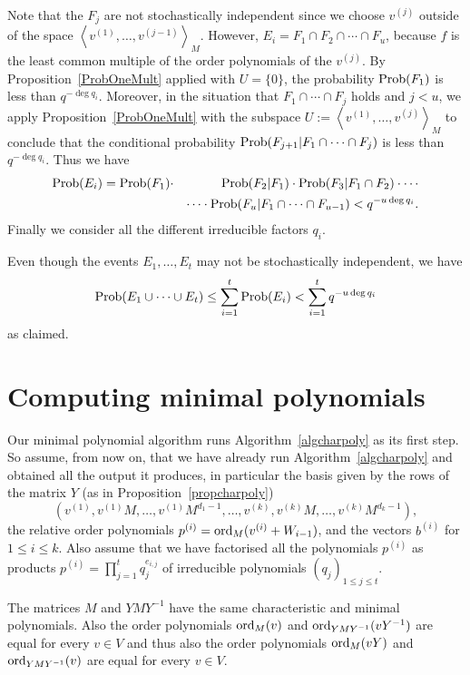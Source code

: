 Note that
the $F_j$ are not stochastically independent since we choose
$v^{(j)}$ outside of the space $\left< v^{(1)}, \ldots, v^{(j-1)}\right>_M$.
However, $E_i = F_1 \cap F_2 \cap \cdots \cap F_u$, because $f$ is the
least common multiple of the order polynomials of the $v^{(j)}$.
By Proposition~\ref{ProbOneMult} applied with $U=\{0\}$, 
the probability $\mathrm{Prob}(F_1)$
is less than $q^{-\deg q_i}$. Moreover, in the situation that 
$F_1 \cap \cdots \cap F_j$ holds and $j<u$,
we apply Proposition~\ref{ProbOneMult} with the
subspace $U := \left< v^{(1)}, \ldots, v^{(j)} \right>_M$ to conclude
that the conditional probability $\mathrm{Prob}(F_{j+1} | F_1 \cap \cdots \cap F_j)$
is less than $q^{-\deg q_i}$.
Thus we have
\begin{eqnarray*}
\mathrm{Prob}(E_i) = \mathrm{Prob}(F_1)&\cdot& \mathrm{Prob}(F_2 | F_1) \cdot \mathrm{Prob}(F_3 | F_1 \cap F_2)
   \cdot \cdots \\
    && \cdots \cdot \mathrm{Prob}(F_u | F_1 \cap \cdots \cap F_{u-1}) 
   < q^{-u\deg q_i}.
\end{eqnarray*}
Finally we consider all the different irreducible factors $q_i$. 

Even though
the events $E_1,\ldots,E_t$ may not be stochastically independent, we have
\[ \mathrm{Prob}( E_1 \cup \cdots \cup E_t ) \le \sum_{i=1}^t \mathrm{Prob}(E_i)
   < \sum_{i=1}^t q^{-u\deg q_i} \]
as claimed.
\proofend

\section{Computing minimal polynomials}
\label{minpoly}

Our minimal polynomial algorithm runs Algorithm~\ref{algcharpoly} as its
first step. So assume, from now on,
that we have already run Algorithm~\ref{algcharpoly}
and obtained all the output it produces, in particular
the basis given by the rows of the matrix $Y$ (as in Proposition~\ref{propcharpoly})
\[ 
(v^{(1)}, v^{(1)}M, \ldots, v^{(1)} M^{d_1-1}, \ldots, v^{(k)}, 
v^{(k)} M, \ldots, v^{(k)} M^{d_k-1}),
\]
the relative order polynomials $p^{(i)} = \mathrm{ord}_M(v^{(i)}
+ W_{i-1})$, and the vectors $b^{(i)}$ for $1 \le i \le k$.
Also assume that we have factorised all the polynomials $p^{(i)}$
as products $p^{(i)} = \prod_{j=1}^t q_j^{e_{i,j}}$ of irreducible 
polynomials $(q_j)_{1 \le j \le t}$.

The matrices $M$ and $YMY^{-1}$ have the same characteristic
and minimal polynomials. Also the order polynomials $\mathrm{ord}_M(v)$ and
$\mathrm{ord}_{YMY^{-1}}(vY^{-1})$ are equal for every $v \in V$ and thus also
the order polynomials $\mathrm{ord}_M(vY)$ and $\mathrm{ord}_{YMY^{-1}}(v)$ are equal for every
$v \in V$.

